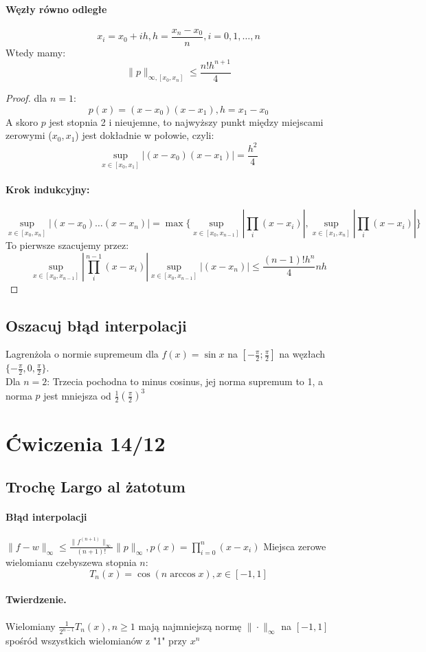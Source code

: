 \documentclass{article}
\begin{document}
\paragraph{Węzły równo odległe}
$$x_i=x_0+ih,h=\frac{x_n-x_0}{n},i=0,1,\dots,n$$
Wtedy mamy:
$$\|p\|_{\infty,[x_0,x_n]}\le \frac{n!h^{n+1}}{4}$$
\begin{proof}
	dla $n = 1$:\\
	$$ p(x)=(x-x_0)(x-x_1),h=x_1-x_0 $$
	A skoro $ p $ jest stopnia 2 i nieujemne, to najwyższy punkt między miejscami zerowymi ($ x_0, x_1 $) jest dokładnie w połowie, czyli:
	$$\sup_{x\in[x_0,x_1]}|(x-x_0)(x-x_1)|=\frac{h^2}{4}$$
	\paragraph{Krok indukcyjny:} $$\sup_{x\in[x_0,x_{n}]}|(x-x_0)\dots(x-x_n)| = \max\{
		\sup_{x\in[x_0,x_{n-1}]}|\prod_{i}(x-x_i)|,
		\sup_{x\in[x_1,x_{n}]}|\prod_{i}(x-x_i)|
	\}$$
	To pierwsze szacujemy przez: 
	$$ \sup_{x\in[x_0,x_{n-1}]}|\prod_{i}^{n-1}(x-x_i)| \sup_{x\in[x_0,x_{n-1}]}|(x-x_n)|\le \frac{(n-1)!h^n}{4}nh$$
\end{proof}
\subsection{Oszacuj błąd interpolacji} Lagrenżola o normie supremeum dla $ f(x)=\sin x $ na $ [-\frac\pi2;\frac\pi2] $ na węzłach $ \{-\frac\pi2,0,\frac\pi2\} $.\\
Dla $n=2$:
Trzecia pochodna to minus cosinus, jej norma supremum to 1, a norma $ p $ jest mniejsza od $ \frac12(\frac\pi2)^3 $
\section{Ćwiczenia 14/12}
\subsection{Trochę Largo al żatotum}
\paragraph{Błąd interpolacji} $\|f-w\|_\infty \le \frac{\|f^{(n+1)}\|_\infty}{(n+1)!}\|p\|_\infty, p(x)=\prod_{i=0}^n(x-x_i)$
Miejsca zerowe wielomianu czebyszewa stopnia $n$:
$$T_n(x)=\cos(n \arccos x), x\in[-1,1]$$
\paragraph{Twierdzenie. }Wielomiany $ \frac1{2^{n-1}}T_n(x), n \ge 1 $ mają najmniejszą normę $ \|\cdot\|_\infty $ na $ [-1,1] $ spośród wszystkich wielomianów z "1" przy $x^n$
\end{document}
